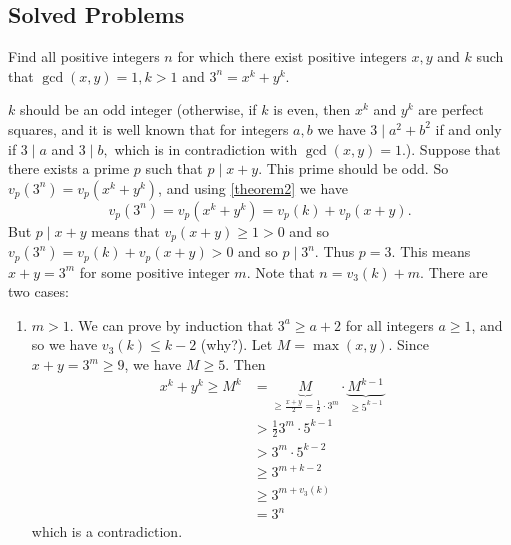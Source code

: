 \subsection{Solved Problems}


    \begin{problem}[Russia 1996]
        Find all positive integers $n$ for which there exist positive integers $x ,y$ and $k$ such that $\gcd(x,y)=1, k>1$ and $3^n = x^k + y^k.$
    \end{problem}

    \begin{solution}
        $k$ should be an odd integer (otherwise, if $k$ is even, then $x^k$ and $y^k$ are perfect squares, and it is well known that for integers $a,b$ we have $3 \mid a^2+b^2$ if and only if $3 \mid a$ and $3 \mid b,$ which is in contradiction with $\gcd(x,y)=1.$). Suppose that there exists a prime $p$ such that $p \mid x+y$. This prime should be odd. So $v_p(3^n)=v_p(x^k+y^k)$, and using \eqref{theorem2} we have $$v_p(3^n)=v_p(x^k+y^k)=v_p(k)+v_p(x+y).$$ But $p \mid x+y$ means that $v_p(x+y) \geq 1 >0$ and so $v_p(3^n)=v_p(k)+v_p(x+y) >0$ and so $p \mid 3^n$. Thus $p=3.$ This means $x+y=3^m$ for some positive integer $m$. Note that $n=v_3(k)+m$. There are two cases:
            \begin{enumerate}
                \item $m>1$. We can prove by induction that $3^a \ge a+2$ for all integers $a\ge 1$, and so we have $v_3(k) \leq k-2$ (why?). Let $M= \max(x,y)$. Since $x+y=3^m\ge 9$, we have $M \geq 5$. Then
                \begin{align*}
	                x^k+ y^k \geq M^k  & =  \underbrace{M}_{\geq \frac{x+y}{2} = \frac{1}{2} \cdot 3^m} \cdot \underbrace{M^{k-1}}_{\geq 5^{k-1}} \\
	                & > \frac{1}{2} 3^m \cdot 5^{k-1} \\
	                &  >3^m \cdot 5^{k-2}\\
	                & \geq 3^{m+k-2} \\
	                & \geq 3^{m + v_3(k)}\\
	                & = 3^n
                \end{align*}
                which is a contradiction.


\end{enumerate}
\end{solution}

